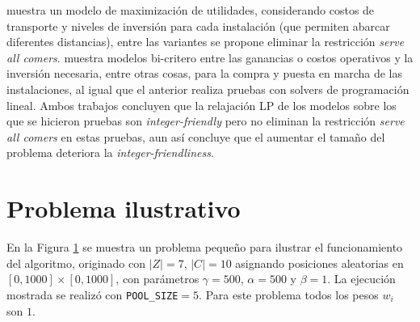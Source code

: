 \documentclass{article}
\begin{document}
\cite{mukundan1991joint} muestra un modelo de maximización de utilidades, considerando costos de transporte y niveles de inversión para cada instalación (que permiten abarcar diferentes distancias), entre las variantes se propone  eliminar la restricción \emph{serve all comers}. \cite{brimberg2000maximum} muestra modelos bi-critero entre las ganancias o costos operativos y la inversión necesaria, entre otras cosas, para la compra y puesta en marcha de las instalaciones, al igual que el anterior realiza pruebas con solvers de programación lineal. Ambos trabajos concluyen que la relajación LP de los modelos sobre los que se hicieron pruebas son \emph{integer-friendly} pero no eliminan la restricción \emph{serve all comers} en estas pruebas, aun así  \cite{brimberg2000maximum} concluye que el aumentar el tamaño del problema deteriora la \emph{integer-friendliness}.



\section{Problema ilustrativo}

En la Figura \ref{fig:ilustrative_problem} se muestra un problema pequeño para ilustrar el funcionamiento del algoritmo, originado con $|Z|=7$, $|C|=10$ asignando posiciones aleatorias en $[0,1000] \times [0,1000]$, con parámetros $\gamma = 500$, $\alpha = 500$ y $\beta = 1$. La ejecución mostrada se realizó con \texttt{POOL\_SIZE}$=5$. Para este problema todos los pesos $w_i$ son $1$.

\begin{figure}
    \centering
    \qquad \qquad \qquad
    \label{fig:ilustrative_problem}
\end{figure}
\end{document}
